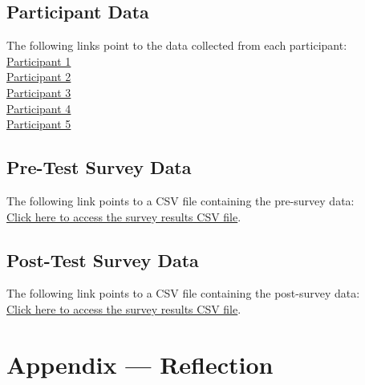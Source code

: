\documentclass[12pt, titlepage]{article}
\begin{document}
\subsection*{Participant Data}
The following links point to the data collected from each participant:\\

{\noindent
  \href{https://github.com/ssm-lab/capstone--source-code-optimizer/blob/main/docs/Extras/UsabilityTesting/test_data/participant1-data.csv}{Participant
  1} \\[2mm]
  \href{https://github.com/ssm-lab/capstone--source-code-optimizer/blob/main/docs/Extras/UsabilityTesting/test_data/participant2-data.csv}{Participant
  2} \\[2mm]
  \href{https://github.com/ssm-lab/capstone--source-code-optimizer/blob/main/docs/Extras/UsabilityTesting/test_data/participant3-data.csv}{Participant
  3} \\[2mm]
  \href{https://github.com/ssm-lab/capstone--source-code-optimizer/blob/main/docs/Extras/UsabilityTesting/test_data/participant4-data.csv}{Participant
  4} \\[2mm]
  \href{https://github.com/ssm-lab/capstone--source-code-optimizer/blob/main/docs/Extras/UsabilityTesting/test_data/participant5-data.csv}{Participant
  5}
}

\subsection*{Pre-Test Survey Data}
The following link points to a CSV file containing the pre-survey data:\\

\noindent
\href{https://github.com/ssm-lab/capstone--source-code-optimizer/blob/main/docs/Extras/UsabilityTesting/surveys/pre-test-survey-data.csv}{Click
here to access the survey results CSV file}.

\subsection*{Post-Test Survey Data}
The following link points to a CSV file containing the post-survey data:\\

\noindent
\href{https://github.com/ssm-lab/capstone--source-code-optimizer/blob/main/docs/Extras/UsabilityTesting/surveys/post-test-survey-data.csv}{Click
here to access the survey results CSV file}.

\newpage{}
\section*{Appendix --- Reflection}
\end{document}
